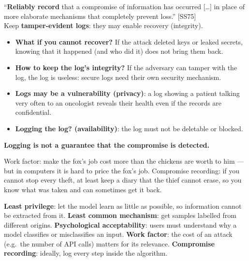 \begin{defnbox}[title=10 -- Compromise recording]
``\textbf{Reliably record} that a compromise of information has occurred [\ldots] in
place of more elaborate mechanisms that completely prevent loss.'' [SS75] \\
Keep \textbf{tamper-evident logs}: they may enable recovery (integrity).
\end{defnbox}

\begin{warnbox}[title=Logs are not magic]
\begin{itemize}
  \item \textbf{What if you cannot recover?} If the attack deleted keys or leaked secrets,
        knowing that it happened (and who did it) does not bring them back.
  \item \textbf{How to keep the log's integrity?} If the adversary can tamper with the log, the
        log is useless: secure logs need their own security mechanism.
  \item \textbf{Logs may be a vulnerability (privacy)}: a log showing a patient talking very often
        to an oncologist reveals their health even if the records are confidential.
  \item \textbf{Logging the log? (availability)}: the log must not be deletable or blocked.
\end{itemize}
\textbf{Logging is not a guarantee that the compromise is detected.}
\end{warnbox}

\begin{goatbox}
Work factor: make the fox's job cost more than the chickens are worth to him --- but in computers
it is hard to price the fox's job. Compromise recording: if you cannot stop every theft, at least
keep a diary that the thief cannot erase, so you know what was taken and can sometimes get it
back.
\end{goatbox}

\begin{exbox}[title={The principles still apply today: machine learning}]
\textbf{Least privilege}: let the model learn as little as possible, so information cannot be
extracted from it. \textbf{Least common mechanism}: get samples labelled from different origins.
\textbf{Psychological acceptability}: users must understand why a model classifies or
misclassifies an input. \textbf{Work factor}: the cost of an attack (e.g.\ the number of API
calls) matters for its relevance. \textbf{Compromise recording}: ideally, log every step inside
the algorithm.
\end{exbox}

